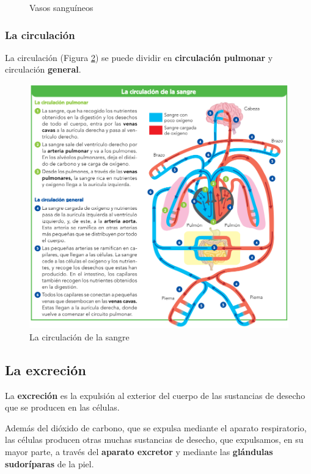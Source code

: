 \begin{itemize}
\begin{figure}[!ht]
        \caption{Vasos sanguíneos}
        \label{fig:vasos-sanguineos}
    \end{figure}
\end{itemize}

\subsubsection{La circulación}

La circulación (Figura \ref{fig:circulacion}) se puede dividir en \textbf{circulación pulmonar} y circulación \textbf{general}.

\begin{figure}[!ht]
    \centering
    \includegraphics[width=1\linewidth]{Tema3/08_Circulacion.png}
    \caption{La circulación de la sangre}
    \label{fig:circulacion}
\end{figure}

\subsection{La excreción}

La \textbf{excreción} es la expulsión al exterior del cuerpo de las sustancias de desecho que se producen en las 
células.

\vspace{3mm}
Además del dióxido de carbono, que se expulsa mediante el aparato respiratorio, las células producen otras muchas sustancias de desecho, que expulsamos, en su mayor parte, a través del \textbf{aparato excretor} y mediante las \textbf{glándulas sudoríparas} de la piel.

